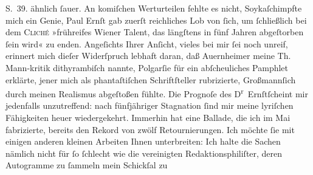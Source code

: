\begin{ledgroupsized}[t]{13cm}
{{{                            S. 39.}}}\label{K_L01946_2h}{ }{\pb}ähnlich ſauer. An komiſchen
                    Werturteilen fehlte es nicht, Soykaſchimpfte mich ein Genie, Paul Ernſt gab zuerſt reichliches Lob von ſich, um
                    ſchließlich bei dem \textsc{Cliché} »frühreifes Wiener Talent, das längſtens in fünf Jahren abgeſtorben
                    ſein wird« zu enden. Angeſichts Ihrer Anſicht, vieles bei mir ſei noch unreif,
                    erinnert mich dieſer Widerſpruch lebhaft daran, daß Auernheimer meine Th.
                        Mann-kritik dithyrambiſch nannte, Polgarſie für ein abſcheuliches Pamphlet erklärte,
                    jener mich als phantaſtiſchen Schriftſteller rubrizierte, Großmannſich durch meinen Realismus abgeſtoßen fühlte.
                    Die Prognoſe des D\textsuperscript{r} Ernſtſcheint mir \introOben{}jedenfalls\introOben{} unzutreffend: nach fünfjähriger Stagnation ſind mir meine
                    lyriſchen Fähigkeiten heuer wiedergekehrt. Immerhin hat eine Ballade, die ich im Mai
                    fabrizierte, bereits den Rekord von zwölf Retournierungen. Ich möchte ſie mit
                    einigen anderen kleinen Arbeiten {\pb}Ihnen unterbreiten: Ich halte die Sachen nämlich nicht für ſo ſchlecht wie die
                    vereinigten Redaktionsphiliſter, deren Autogramme zu ſammeln mein Schickſal zu

\end{ledgroupsized}
